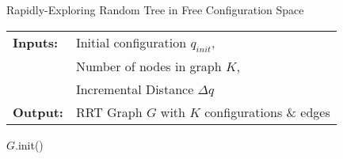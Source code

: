 
\begin{algorithm}[H]
    \caption{Rapidly-Exploring Random Tree in Free Configuration Space}
    \SetAlgoLined
    \begin{tabular}{l l}
    \textbf{Inputs:}    & Initial configuration $q_{init}$,\\ 
                        & Number of nodes in graph $K$, \\
                        & Incremental Distance $\Delta q$ \\
    \textbf{Output:}    & RRT Graph $G$ with $K$ configurations \& edges \\
    \end{tabular}

        $G$.init()\;
\label{algorithm:rrt}
\end{algorithm}